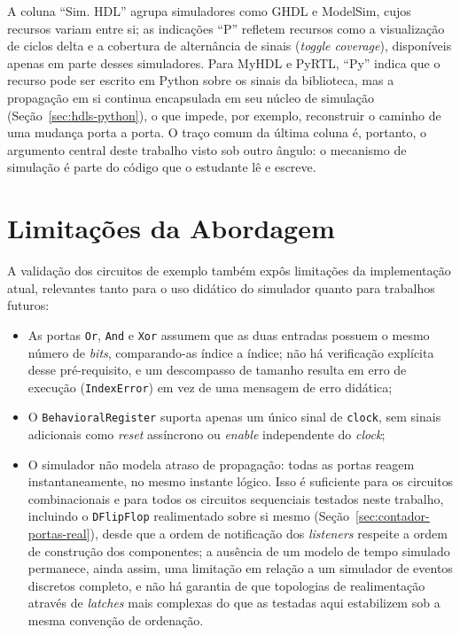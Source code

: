 A coluna ``Sim. HDL'' agrupa simuladores como GHDL e ModelSim, cujos recursos variam entre si; as indicações ``P'' refletem recursos como a visualização de ciclos delta e a cobertura de alternância de sinais (\textit{toggle coverage}), disponíveis apenas em parte desses simuladores. Para MyHDL e PyRTL, ``Py'' indica que o recurso pode ser escrito em Python sobre os sinais da biblioteca, mas a propagação em si continua encapsulada em seu núcleo de simulação (Seção~\ref{sec:hdls-python}), o que impede, por exemplo, reconstruir o caminho de uma mudança porta a porta. O traço comum da última coluna é, portanto, o argumento central deste trabalho visto sob outro ângulo: o mecanismo de simulação é parte do código que o estudante lê e escreve.

\section{Limitações da Abordagem}
\label{sec:limitacoes}

A validação dos circuitos de exemplo também expôs limitações da implementação atual, relevantes tanto para o uso didático do simulador quanto para trabalhos futuros:

\begin{itemize}
    \item As portas \texttt{Or}, \texttt{And} e \texttt{Xor} assumem que as duas entradas possuem o mesmo número de \textit{bits}, comparando-as índice a índice; não há verificação explícita desse pré-requisito, e um descompasso de tamanho resulta em erro de execução (\texttt{IndexError}) em vez de uma mensagem de erro didática;
    \item O \texttt{BehavioralRegister} suporta apenas um único sinal de \texttt{clock}, sem sinais adicionais como \textit{reset} assíncrono ou \textit{enable} independente do \textit{clock};
    \item O simulador não modela atraso de propagação: todas as portas reagem instantaneamente, no mesmo instante lógico. Isso é suficiente para os circuitos combinacionais e para todos os circuitos sequenciais testados neste trabalho, incluindo o \texttt{DFlipFlop} realimentado sobre si mesmo (Seção~\ref{sec:contador-portas-real}), desde que a ordem de notificação dos \textit{listeners} respeite a ordem de construção dos componentes; a ausência de um modelo de tempo simulado permanece, ainda assim, uma limitação em relação a um simulador de eventos discretos completo, e não há garantia de que topologias de realimentação através de \textit{latches} mais complexas do que as testadas aqui estabilizem sob a mesma convenção de ordenação.
\end{itemize}

